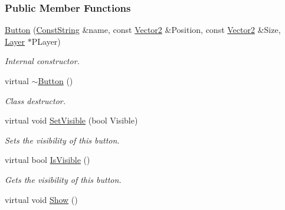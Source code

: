 \subsubsection*{Public Member Functions}
\begin{DoxyCompactItemize}
\item 
\hyperlink{classphys_1_1UI_1_1Button_ada143b3ce98b414348c43c8af7cf4006}{Button} (\hyperlink{namespacephys_a5ce5049f8b4bf88d6413c47b504ebb31}{ConstString} \&name, const \hyperlink{classphys_1_1Vector2}{Vector2} \&Position, const \hyperlink{classphys_1_1Vector2}{Vector2} \&Size, \hyperlink{classphys_1_1UI_1_1Layer}{Layer} $\ast$PLayer)
\begin{DoxyCompactList}\small\item\em Internal constructor. \item\end{DoxyCompactList}\item 
\hypertarget{classphys_1_1UI_1_1Button_a80c8c92ae289e3161dde94bf1a5de59e}{
virtual \hyperlink{classphys_1_1UI_1_1Button_a80c8c92ae289e3161dde94bf1a5de59e}{$\sim$Button} ()}
\label{d8/d88/classphys_1_1UI_1_1Button_a80c8c92ae289e3161dde94bf1a5de59e}

\begin{DoxyCompactList}\small\item\em Class destructor. \item\end{DoxyCompactList}\item 
virtual void \hyperlink{classphys_1_1UI_1_1Button_a293a0a5296778fb3d638c31c5d9d4c75}{SetVisible} (bool Visible)
\begin{DoxyCompactList}\small\item\em Sets the visibility of this button. \item\end{DoxyCompactList}\item 
virtual bool \hyperlink{classphys_1_1UI_1_1Button_a2bca8ace690157fa2646bcf1cb54397a}{IsVisible} ()
\begin{DoxyCompactList}\small\item\em Gets the visibility of this button. \item\end{DoxyCompactList}\item 
\hypertarget{classphys_1_1UI_1_1Button_aad25b9ec4b9c7cc232d419dcd68f420e}{
virtual void \hyperlink{classphys_1_1UI_1_1Button_aad25b9ec4b9c7cc232d419dcd68f420e}{Show} ()}
\label{d8/d88/classphys_1_1UI_1_1Button_aad25b9ec4b9c7cc232d419dcd68f420e}


\end{DoxyCompactItemize}

